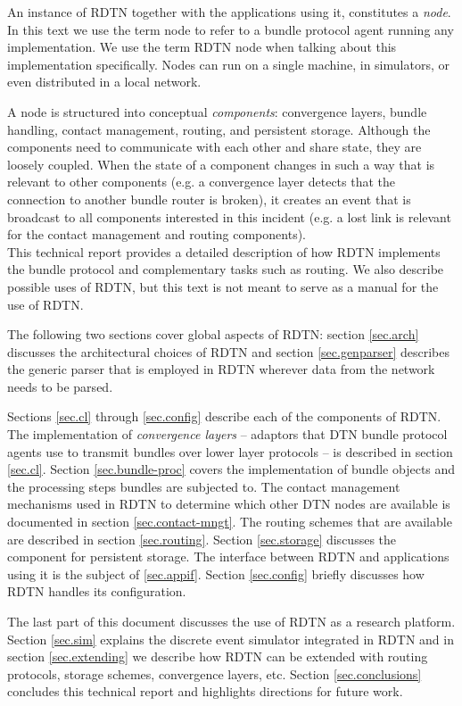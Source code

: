 \documentclass[a4paper]{article}
\begin{document}
An instance of RDTN together with the applications using it, constitutes a {\em
node}. In this text we use the term node to refer to a bundle protocol agent
running any implementation. We use the term RDTN node when talking about this
implementation specifically. Nodes can run on a single machine, in simulators,
or even distributed in a local network.

A node is structured into conceptual {\em components}: convergence layers,
bundle handling, contact management, routing, and persistent storage.  Although
the components need to communicate with each other and share state, they are
loosely coupled. When the state of a component changes in such a way that is
relevant to other components (e.g. a convergence layer detects that the
connection to another bundle router is broken), it creates an event that is
broadcast to all components interested in this incident (e.g. a lost link is
relevant for the contact management and routing components).\\

This technical report provides a detailed description of how RDTN implements the
bundle protocol and complementary tasks such as routing. We also describe
possible uses of RDTN, but this text is not meant to serve as a manual for the
use of RDTN.

The following two sections cover global aspects of RDTN: section \ref{sec.arch}
discusses the architectural choices of RDTN and section \ref{sec.genparser}
describes the generic parser that is employed in RDTN wherever data from the
network needs to be parsed.

Sections \ref{sec.cl} through \ref{sec.config} describe each of the components
of RDTN.  The implementation of {\em convergence layers} -- adaptors that DTN
bundle protocol agents use to transmit bundles over lower layer protocols -- is
described in section \ref{sec.cl}. Section \ref{sec.bundle-proc} covers the
implementation of bundle objects and the processing steps bundles are subjected
to. The contact management mechanisms used in RDTN to determine which other DTN
nodes are available is documented in section \ref{sec.contact-mngt}. The routing
schemes that are available are
described in section \ref{sec.routing}. Section \ref{sec.storage} discusses the
component for persistent storage. The interface between RDTN and applications
using it is the subject of \ref{sec.appif}. Section \ref{sec.config} briefly
discusses how RDTN handles its configuration.

The last part of this document discusses the use of RDTN as a research platform.
Section \ref{sec.sim} explains the discrete event simulator integrated in RDTN
and in section \ref{sec.extending} we describe how RDTN can be extended with
routing protocols, storage schemes, convergence layers, etc. Section
\ref{sec.conclusions} concludes this technical report and highlights directions
for future work.
\end{document}
